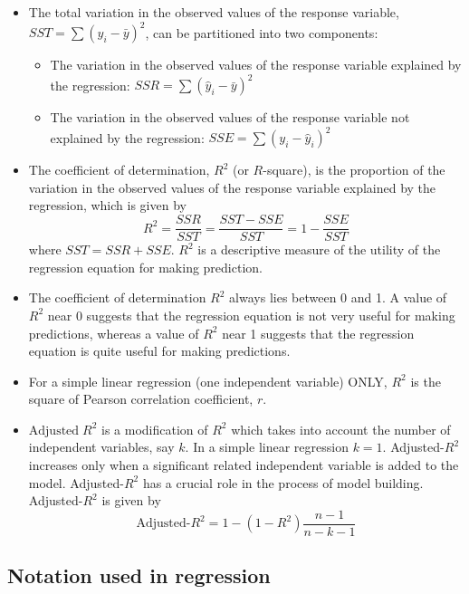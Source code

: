 \documentclass[
]{article}
\providecommand{\tightlist}{%
  \setlength{\itemsep}{0pt}\setlength{\parskip}{0pt}}
\begin{document}
\begin{itemize}
\item
  The total variation in the observed values of the response variable,
  \(SST=\sum(y_i-\bar{y})^2\), can be partitioned into two components:

  \begin{itemize}
  \tightlist
  \item
    The variation in the observed values of the response variable
    explained by the regression: \(SSR=\sum(\hat{y}_i-\bar{y})^2\)
  \item
    The variation in the observed values of the response variable not
    explained by the regression: \(SSE=\sum(y_i-\hat{y}_i)^2\)
  \end{itemize}
\item
  The coefficient of determination, \(R^2\) (or \(R\)-square), is the
  proportion of the variation in the observed values of the response
  variable explained by the regression, which is given by
  \[R^2=\frac{SSR}{SST}=\frac{SST-SSE}{SST}=1-\frac{SSE}{SST}\] where
  \(SST=SSR+SSE\). \(R^2\) is a descriptive measure of the utility of
  the regression equation for making prediction.
\item
  The coefficient of determination \(R^2\) always lies between 0 and 1.
  A value of \(R^2\) near 0 suggests that the regression equation is not
  very useful for making predictions, whereas a value of \(R^2\) near 1
  suggests that the regression equation is quite useful for making
  predictions.
\item
  For a simple linear regression (one independent variable) ONLY,
  \(R^2\) is the square of Pearson correlation coefficient, \(r\).
\item
  \(\text{Adjusted}\;R^2\) is a modification of \(R^2\) which takes into
  account the number of independent variables, say \(k\). In a simple
  linear regression \(k=1\). Adjusted-\(R^2\) increases only when a
  significant related independent variable is added to the model.
  Adjusted-\(R^2\) has a crucial role in the process of model building.
  Adjusted-\(R^2\) is given by
  \[\text{Adjusted-}R^2=1-(1-R^2)\frac{n-1}{n-k-1}\]
\end{itemize}

\hypertarget{notation-used-in-regression}{%
\subsection{Notation used in
regression}\label{notation-used-in-regression}}
\end{document}
